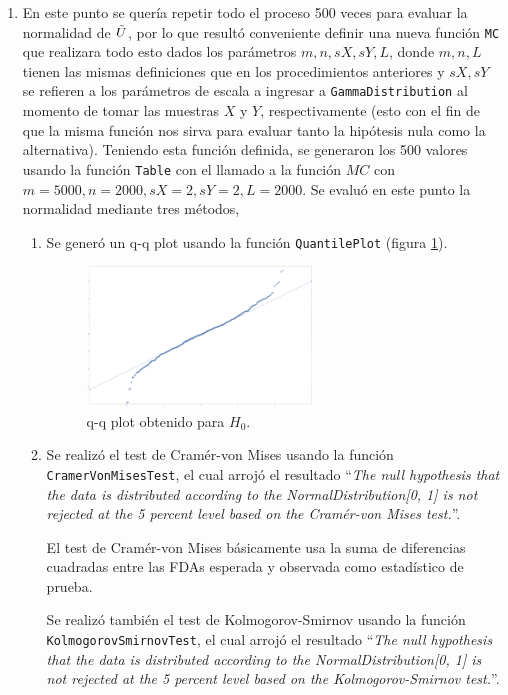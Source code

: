 \documentclass[letter]{article}
\begin{document}
\begin{enumerate}
\item En este punto se quería repetir todo el proceso 500 veces para evaluar la normalidad de $\Tilde{U}$, por lo que resultó conveniente definir una nueva función \texttt{MC} que realizara todo esto dados los parámetros $m,n,sX,sY,L$, donde $m,n,L$ tienen las mismas definiciones que en los procedimientos anteriores y $sX,sY$ se refieren a los parámetros de escala a ingresar a \texttt{GammaDistribution} al momento de tomar las muestras $X$ y $Y$, respectivamente (esto con el fin de que la misma función nos sirva para evaluar tanto la hipótesis nula como la alternativa). Teniendo esta función definida, se generaron los 500 valores usando la función \texttt{Table} con el llamado a la función $MC$ con $m = 5000, n = 2000, sX = 2, sY = 2, L = 2000$. Se evaluó en este punto la normalidad mediante tres métodos,

\begin{enumerate}[label=(\roman*)]

\item Se generó un q-q plot usando la función \texttt{QuantilePlot} (figura \ref{fig:H0}).

\begin{figure}[h!]
    \centering
    \includegraphics[width=0.6\textwidth]{q-q_H0.pdf}
    \caption{q-q plot obtenido para $H_0$.}
    \label{fig:H0}
\end{figure}

\item Se realizó el test de Cramér-von Mises usando la función \texttt{CramerVonMisesTest}, el cual arrojó el resultado ``\emph{The null hypothesis that the data is distributed according to the NormalDistribution[0, 1] is not rejected at the 5 percent level based on the Cramér-von Mises test.}''.

El test de Cramér-von Mises básicamente usa la suma de diferencias cuadradas entre las FDAs esperada y observada como estadístico de prueba.

Se realizó también el test de Kolmogorov-Smirnov usando la función \texttt{KolmogorovSmirnovTest}, el cual arrojó el resultado ``\emph{The null hypothesis that the data is distributed according to the NormalDistribution[0, 1] is not rejected at the 5 percent level based on the Kolmogorov-Smirnov test.}''.


\end{enumerate}
\end{enumerate}
\end{document}
